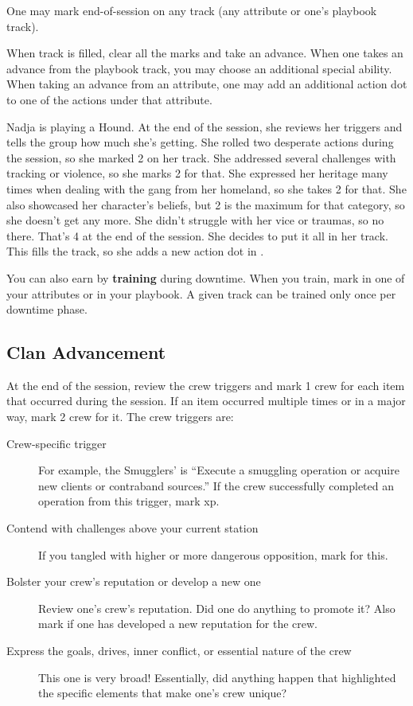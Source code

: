 One may mark end-of-session  on any  track (any attribute or one's playbook  track).

When  track is filled, clear all the marks and take an advance. When one takes an advance from the playbook track, you may choose an additional special ability. When taking an advance from an attribute, one may add an additional action dot to one of the actions under that attribute.

\begin{qb}Nadja is playing a Hound. At the end of the session, she reviews her  triggers and tells the group how much  she’s getting. She rolled two desperate  actions during the session, so she marked 2  on her   track. She addressed several challenges with tracking or violence, so she marks 2  for that. She expressed her heritage many times when dealing with the gang from her homeland, so she takes 2  for that. She also showcased her character’s beliefs, but 2  is the maximum for that category, so she doesn’t get any more. She didn’t struggle with her vice or traumas, so no  there. That’s 4  at the end of the session. She decides to put it all in her   track. This fills the track, so she adds a new action dot in .\end{qb}

You can also earn  by \textbf{training} during downtime. When you train, mark  in one of your attributes or in your playbook. A given  track can be trained only once per downtime phase.

\subsection{Clan Advancement}

At the end of the session, review the crew  triggers and mark 1 crew  for each item that occurred during the session. If an item occurred multiple times or in a major way, mark 2 crew  for it. The crew  triggers are:

\begin{description}
\item[Crew-specific  trigger] For example, the Smugglers’ is ``Execute a smuggling operation or acquire new clients or contraband sources.'' If the crew successfully completed an operation from this trigger, mark xp.
\item[Contend with challenges above your current station] If you tangled with higher  or more dangerous opposition, mark  for this.
\item[Bolster your crew’s reputation or develop a new one] Review one's crew’s reputation. Did one do anything to promote it? Also mark  if one has developed a new reputation for the crew.
\item[Express the goals, drives, inner conflict, or essential nature of the crew] This one is very broad! Essentially, did anything happen that highlighted the specific elements that make one's crew unique?
\end{description}

